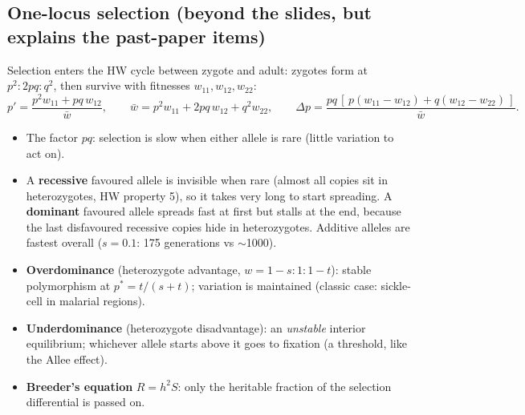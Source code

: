 \subsection{One-locus selection (beyond the slides, but explains the past-paper items)}
Selection enters the HW cycle between zygote and adult: zygotes form at $p^2:2pq:q^2$, then survive with fitnesses
$w_{11},w_{12},w_{22}$:
\[
p'=\frac{p^2w_{11}+pq\,w_{12}}{\bar w},\qquad \bar w=p^2w_{11}+2pq\,w_{12}+q^2w_{22},\qquad
\Delta p=\frac{pq\,[\,p(w_{11}-w_{12})+q(w_{12}-w_{22})\,]}{\bar w}.
\]
\begin{chain}
\begin{itemize}
\item The factor $pq$: selection is slow when either allele is rare (little variation to act on).
\item A \textbf{recessive} favoured allele is invisible when rare (almost all copies sit in heterozygotes, HW property 5),
so it takes very long to start spreading. A \textbf{dominant} favoured allele spreads fast at first but stalls at the end,
because the last disfavoured recessive copies hide in heterozygotes. Additive alleles are fastest overall ($s=0.1$: 175
generations vs $\sim$1000).
\item \textbf{Overdominance} (heterozygote advantage, $w=1-s:1:1-t$): stable polymorphism at $p^*=t/(s+t)$; variation is
maintained (classic case: sickle-cell in malarial regions).
\item \textbf{Underdominance} (heterozygote disadvantage): an \emph{unstable} interior equilibrium; whichever allele starts
above it goes to fixation (a threshold, like the Allee effect).
\item \textbf{Breeder's equation} $R=h^2S$: only the heritable fraction of the selection differential is passed on.
\end{itemize}
\end{chain}

